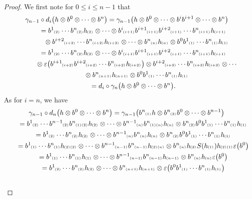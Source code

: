 \documentclass[pdftex]{sigma}
\numberwithin{equation}{section}
\newcommand{\ps}[1]{~\hspace{-4pt}_{^{(#1)}}}
\begin{document}
\begin{proof}
We f\/irst note for $0\leq i \leq n-1$ that
\begin{gather*}
\gamma_{n-1}\circ d_i\big(h\otimes b^0\otimes\cdots\otimes b^n\big) =\gamma_{n-1}\big(h\otimes b^0\otimes\cdots\otimes b^ib^{i+1}\otimes\cdots\otimes b^n\big)
\\
\qquad
=b^1\ps{2}\cdots b^n\ps{2}h\ps{2} \otimes\cdots\otimes b^i\ps{i+1}b^{i+1}\ps{i+1}b^{i+2}\ps{i+1}\cdots
b^n\ps{i+1}h\ps{i+1}
\\
\qquad\phantom{=}{}
\otimes b^{i+2}\ps{i+2}\cdots b^n\ps{i+2}h\ps{i+2}
\otimes\cdots
\otimes b^n\ps{n}h\ps{n}\otimes b^0b^1\ps{1}\cdots b^n\ps{1}h\ps{1}
\\
\qquad
=b^1\ps{2}\cdots b^n\ps{2}h\ps{2} \otimes\cdots\otimes b^i\ps{i+1}b^{i+1}\ps{i+1}b^{i+2}\ps{i+1}\cdots b^n\ps{i+1}h\ps{i+1}
\\
\qquad\phantom{=}{}\otimes
\varepsilon\big(b^{i+1}\ps{i+2}b^{i+2}\ps{i+2}\cdots b^n\ps{i+2}h\ps{i+2}\big)\otimes b^{i+2}\ps{i+3}\cdots b^n\ps{i+3}h\ps{i+3}
\otimes\cdots  \\
\qquad\phantom{=}{}
\otimes b^n\ps{n+1}h\ps{n+1}\otimes b^0b^1\ps{1}\cdots b^n\ps{1}h\ps{1}
\\
\qquad
=d_i\circ \gamma_n \big(h\otimes b^0\otimes\cdots\otimes b^n\big).
\end{gather*}
As for $i=n$, we have
\begin{gather*}
\gamma_{n-1}\circ d_n\big(h\otimes b^0\otimes\cdots\otimes b^n\big) =\gamma_{n-1}\big(b^n\ps{1}h\otimes
b^n\ps{2}b^0\otimes\cdots\otimes b^{n-1}\big)
\\
\qquad
=b^1\ps{2}\cdots b^{n-1}\ps{2}b^n\ps{1}\ps{2}h\ps{2} \otimes\cdots\otimes b^{n-1}\ps{n}b^n\ps{1}\ps{n}h\ps{n}\otimes
b^n\ps{2}b^0b^1\ps{1}\cdots b^n\ps{1}h\ps{1}
\\
\qquad
=b^1\ps{2}\cdots b^n\ps{2}h\ps{2} \otimes\cdots\otimes b^{n-1}\ps{n}b^n\ps{n}h\ps{n}\otimes b^n\ps{2}b^0b^1\ps{1}\cdots b^n\ps{1}h\ps{1}
\\
\qquad
=b^1\ps{1}\cdots b^n\ps{1}h\ps{2}\ps{2} \otimes\cdots\otimes b^{n-1}\ps{n-1}b^n\ps{n-1}h\ps{2}\ps{n}\otimes
b^n\ps{n}h\ps{3}S(h\ps{1})h\ps{2}\ps{1}\varepsilon\big(b^0\big)
\\
\qquad
=b^1\ps{1}\cdots b^n\ps{1}h\ps{1} \otimes\cdots\otimes b^{n-1}\ps{n-1}b^n\ps{n-1}h\ps{n-1}\otimes b^n\ps{n}h\ps{n}\varepsilon\big(b^0\big)
\\
\qquad
=b^1\ps{2}\cdots b^n\ps{2}h\ps{2} \otimes\cdots\otimes b^n\ps{n+1}h\ps{n+1}\otimes \varepsilon\big(b^0b^1\ps{1}\cdots b^n\ps{1}h\ps{1}\big)
\\
\qquad

\end{gather*}
\end{proof}
\end{document}
